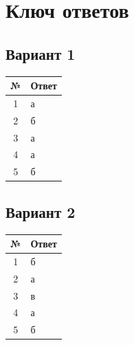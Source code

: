 \documentclass[11pt,a4paper]{article}
\begin{document}
\clearpage
\section*{Ключ ответов}

\subsection*{Вариант 1}
\begin{tabularx}{0.8\linewidth}{cX}
\toprule
№ & Ответ \\
\midrule
1 & а \\
2 & б \\
3 & а \\
4 & а \\
5 & б \\
\bottomrule
\end{tabularx}


\clearpage
\subsection*{Вариант 2}
\begin{tabularx}{0.8\linewidth}{cX}
\toprule
№ & Ответ \\
\midrule
1 & б \\
2 & а \\
3 & в \\
4 & а \\
5 & б \\
\bottomrule
\end{tabularx}
\end{document}

